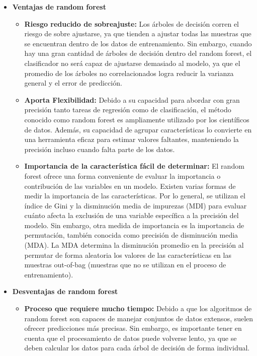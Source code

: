 \begin{itemize}
    \item \textbf{Ventajas de random forest}
    \begin{itemize}
        \item \textbf{Riesgo reducido de sobreajuste:} Los árboles de decisión corren el riesgo de sobre ajustarse, ya que tienden a ajustar todas las muestras que se encuentran dentro de los datos de entrenamiento. Sin embargo, cuando hay una gran cantidad de árboles de decisión dentro del random forest, el clasificador no será capaz de ajustarse demasiado al modelo, ya que el promedio de los árboles no correlacionados logra reducir la varianza general y el error de predicción.
        \item \textbf{Aporta Flexibilidad:} Debido a su capacidad para abordar con gran precisión tanto tareas de regresión como de clasificación, el método conocido como random forest es ampliamente utilizado por los científicos de datos. Además, su capacidad de agrupar características lo convierte en una herramienta eficaz para estimar valores faltantes, manteniendo la precisión incluso cuando falta parte de los datos.
        \item \textbf{Importancia de la característica fácil de determinar:} El random forest ofrece una forma conveniente de evaluar la importancia o contribución de las variables en un modelo. Existen varias formas de medir la importancia de las características. Por lo general, se utilizan el índice de Gini y la disminución media de impurezas (MDI) para evaluar cuánto afecta la exclusión de una variable específica a la precisión del modelo.
        Sin embargo, otra medida de importancia es la importancia de permutación, también conocida como precisión de disminución media (MDA). La MDA determina la disminución promedio en la precisión al permutar de forma aleatoria los valores de las características en las muestras out-of-bag (muestras que no se utilizan en el proceso de entrenamiento).
    \end{itemize}
    \item \textbf{Desventajas de random forest}
    \begin{itemize}
        \item \textbf{Proceso que requiere mucho tiempo:} Debido a que los algoritmos de random forest son capaces de manejar conjuntos de datos extensos, suelen ofrecer predicciones más precisas. Sin embargo, es importante tener en cuenta que el procesamiento de datos puede volverse lento, ya que se deben calcular los datos para cada árbol de decisión de forma individual.  

\end{itemize}
\end{itemize}

